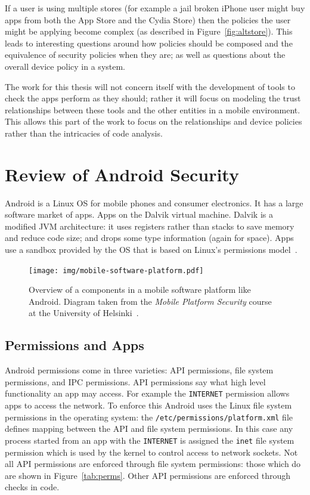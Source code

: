 \documentclass[a4paper]{article}
\begin{document}
If a user is using multiple stores (for example a jail broken iPhone user might
buy apps from both the App Store and the Cydia Store) then the policies the user
might be applying become complex (as described in Figure~\ref{fig:altstore}).
This leads to interesting questions around how policies should be composed and
the equivalence of security policies when they are; as well as questions about
the overall device policy in a system.

The work for this thesis will not concern itself with the development of tools
to check the apps perform as they should; rather it will focus on modeling the
trust relationships between these tools and the other entities in a mobile
environment.  This allows this part of the work to focus on the relationships
and device policies rather than the intricacies of code analysis.


\section{Review of Android Security}

Android is a Linux OS for mobile phones and consumer electronics. It has a large
software market of apps. Apps on the Dalvik virtual machine.  Dalvik is a
modified JVM architecture: it uses registers rather than stacks to save memory
and reduce code size; and drops some type information (again for space).  Apps
use a sandbox provided by the OS that is based on Linux's permissions
model~\cite{Drake:2014uq}.

\begin{figure}
  \centering
  \texttt{[image: img/mobile-software-platform.pdf]}
  \caption{Overview of a components in a mobile software platform like Android.
    Diagram taken from the \emph{Mobile Platform Security} course at the
  University of Helsinki~\cite{Asokan:9AWuNtvh}.}
  \label{fig:mobilesoftwareplatform}
\end{figure}

\subsection{Permissions and Apps}


Android permissions come in three varieties: API permissions, file system
permissions, and IPC permissions.  API permissions say what high level
functionality an app may access.  For example the \texttt{INTERNET} permission
allows apps to access the network.  To enforce this Android uses the
Linux file system permissions in the operating system: the
\texttt{/etc/permissions/platform.xml} file defines mapping between the API
and file system permissions.  In this case any process started from an app with
the \texttt{INTERNET} is assigned the \texttt{inet} file system permission which
is used by the kernel to control access to network sockets.  Not all API
permissions are enforced through file system permissions: those which do are
shown in Figure~\ref{tab:perms}.  Other API permissions are enforced through
checks in code.  
\end{document}
